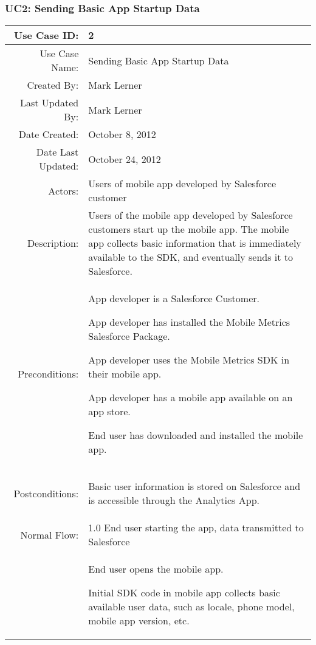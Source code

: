 \documentclass[12pt,oneside,letterpaper]{article}
\newenvironment{packed_enumerate}{ %
\vspace{-7mm}
\begin{enumerate}
  \setlength{\itemsep}{0pt}
  \setlength{\parskip}{0pt}
  \setlength{\parsep}{0pt}
}{\end{enumerate}
\vspace{-8mm}}
\begin{document}
\subsubsection{\label{Sending Basic App Startup Data}UC2: Sending Basic App Startup Data}
\begin{longtable}{|r|p{3.8in}|}
\hline
Use Case ID:&2\\
\hline
Use Case Name:&Sending Basic App Startup Data\\
\hline
Created By:&Mark Lerner\\
\hline
Last Updated By:&Mark Lerner\\
\hline
Date Created:&October 8, 2012\\
\hline
Date Last Updated:&October 24, 2012\\
\hline
Actors:&Users of mobile app developed by Salesforce customer\\
\hline
Description:&Users of the mobile app developed by Salesforce customers start up the mobile app. The mobile app collects basic information that is immediately available to the SDK, and eventually sends it to Salesforce. \\
\hline
Preconditions:&
\begin{packed_enumerate}
\item App developer is a Salesforce Customer.
\item App developer has installed the Mobile Metrics Salesforce Package.
\item App developer uses the Mobile Metrics SDK in their mobile app.
\item App developer has a mobile app available on an app store.
\item End user has downloaded and installed the mobile app.
\end{packed_enumerate}\\
\hline
Postconditions:&
\begin{packed_enumerate}
\item Basic user information is stored on Salesforce and is accessible through the Analytics App.
\end{packed_enumerate}\\
\hline
Normal Flow:&1.0 End user starting the app, data transmitted to Salesforce\\
&  %
\begin{packed_enumerate}
\item End user opens the mobile app.
\item Initial SDK code in mobile app collects basic available user data, such as locale, phone model, mobile app version, etc.

\end{packed_enumerate}
\end{longtable}
\end{document}
